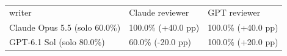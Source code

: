 \begin{tabular}{lll}
writer & Claude reviewer & GPT reviewer \\
Claude Opus 5.5 (solo 60.0\%) & 100.0\% (+40.0 pp) & 100.0\% (+40.0 pp) \\
GPT-6.1 Sol (solo 80.0\%) & 60.0\% (-20.0 pp) & 100.0\% (+20.0 pp) \\
\end{tabular}
